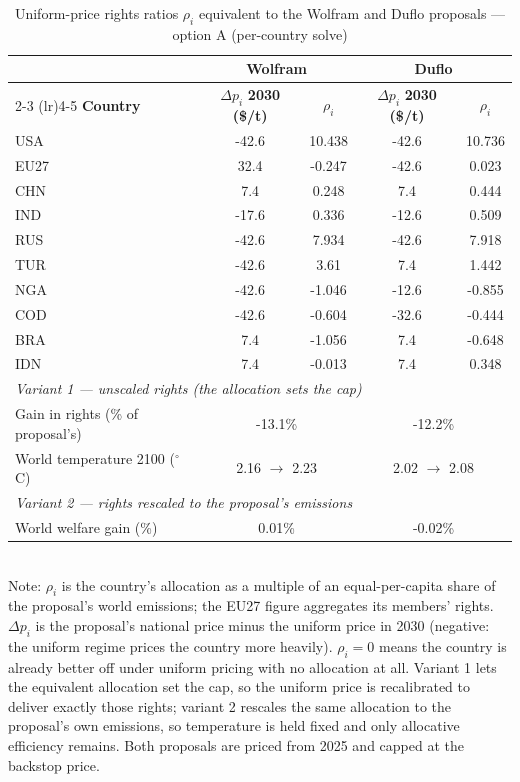 \begin{table}[htbp]
\centering
\small
\caption{Uniform-price rights ratios $\rho_i$ equivalent to the Wolfram and Duflo proposals --- option A (per-country solve)}
\renewcommand{\arraystretch}{1.15}
\begin{tabular}{lcccc}
  \toprule
  & \multicolumn{2}{c}{\textbf{Wolfram}} & \multicolumn{2}{c}{\textbf{Duflo}} \\
  \cmidrule(lr){2-3} \cmidrule(lr){4-5}
  \textbf{Country} & $\Delta p_i$ \textbf{2030 (\$/t)} & $\rho_i$ & $\Delta p_i$ \textbf{2030 (\$/t)} & $\rho_i$ \\
  \midrule
  USA & -42.6 & 10.438 & -42.6 & 10.736 \\
  EU27 & 32.4 & -0.247 & -42.6 & 0.023 \\
  CHN & 7.4 & 0.248 & 7.4 & 0.444 \\
  IND & -17.6 & 0.336 & -12.6 & 0.509 \\
  RUS & -42.6 & 7.934 & -42.6 & 7.918 \\
  TUR & -42.6 & 3.61 & 7.4 & 1.442 \\
  NGA & -42.6 & -1.046 & -12.6 & -0.855 \\
  COD & -42.6 & -0.604 & -32.6 & -0.444 \\
  BRA & 7.4 & -1.056 & 7.4 & -0.648 \\
  IDN & 7.4 & -0.013 & 7.4 & 0.348 \\
  \midrule
  \multicolumn{5}{l}{\textit{Variant 1 --- unscaled rights (the allocation sets the cap)}} \\
  \quad Gain in rights (\% of proposal's) & \multicolumn{2}{c}{-13.1\%} & \multicolumn{2}{c}{-12.2\%} \\
  \quad World temperature 2100 ($^\circ$C) & \multicolumn{2}{c}{2.16 $\to$ 2.23} & \multicolumn{2}{c}{2.02 $\to$ 2.08} \\
  \midrule
  \multicolumn{5}{l}{\textit{Variant 2 --- rights rescaled to the proposal's emissions}} \\
  \quad World welfare gain (\%) & \multicolumn{2}{c}{0.01\%} & \multicolumn{2}{c}{-0.02\%} \\
  \bottomrule
\end{tabular}
\label{tab:equivalent_rights_option_a_(per-country_solve)}
\\[4pt]
{\footnotesize Note: $\rho_i$ is the country's allocation as a multiple of an equal-per-capita share of the proposal's world emissions; the EU27 figure aggregates its members' rights. $\Delta p_i$ is the proposal's national price minus the uniform price in 2030 (negative: the uniform regime prices the country more heavily). $\rho_i = 0$ means the country is already better off under uniform pricing with no allocation at all. Variant 1 lets the equivalent allocation set the cap, so the uniform price is recalibrated to deliver exactly those rights; variant 2 rescales the same allocation to the proposal's own emissions, so temperature is held fixed and only allocative efficiency remains. Both proposals are priced from 2025 and capped at the backstop price.}
\end{table}
